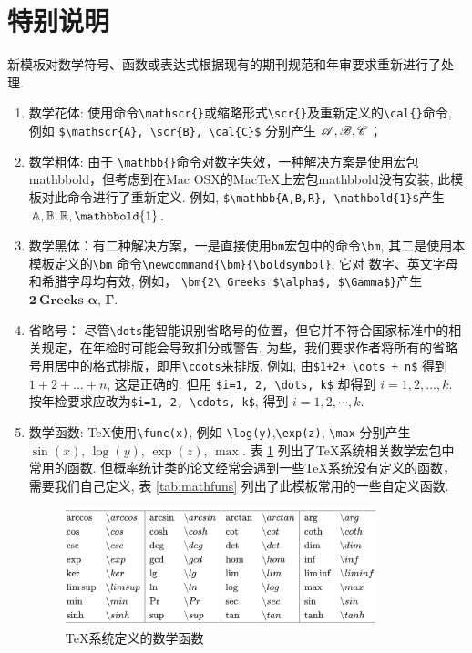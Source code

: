 \documentclass[Chinese]{APSart}
\begin{document}
\section{特别说明}\label{remarks}

新模板对数学符号、函数或表达式根据现有的期刊规范和年审要求重新进行了处理.
\begin{enumerate}[leftmargin=7.8mm,itemsep=-0.1ex, label=(\arabic*)]
\item 数学花体: 使用命令\verb/\mathscr{}/或缩略形式\verb|\scr{}|及重新定义的\verb|\cal{}|命令, 例如 \verb/$\mathscr{A}, \scr{B}, \cal{C}$/ 分别产生 $\mathscr{A}, \mathscr{B}, \mathscr{C}$；
\item 数学粗体: 由于
\verb|\mathbb{}|命令对数字失效，一种解决方案是使用宏包mathbbold，但考虑到在Mac OSX的Mac\TeX{}上宏包mathbbold没有安装, 此模板对此命令进行了重新定义. 例如, 
\verb/$\mathbb{A,B,R}, \mathbold{1}$/产生$\mathbb{A,B,R}, \mathbbold{1}$.
\item 数学黑体：有二种解决方案，一是直接使用\texttt{bm}宏包中的命令\verb|\bm|, 其二是使用本模板定义的\verb|\bm| 命令\verb/\newcommand{\bm}{\boldsymbol}/, 它对 
数字、英文字母和希腊字母均有效, 例如，
\verb|\bm{2\ Greeks $\alpha$, $\Gamma$}|产生 $\bm{2\ Greeks}$ $\bm{\alpha}$, $\bm{\Gamma}$.
\item 省略号： 尽管\verb|\dots|能智能识别省略号的位置，但它并不符合国家标准中的相关规定，在年检时可能会导致扣分或警告. 为些，我们要求作者将所有的省略号用居中的格式排版，即用\verb/\cdots/来排版. 例如,  
由\verb=$1+2+ \dots + n$= 得到 $1+2+ \dots + n$, 这是正确的. 但用
\verb/$i=1, 2, \dots, k$/ 却得到 $i=1, 2, \dots, k$. 按年检要求应改为\verb/$i=1, 2, \cdots, k$/,  得到 $i=1, 2, \cdots, k$.
\item 数学函数: \TeX{}使用\verb|\func(x)|, 例如 \verb|\log(y)|,\verb|\exp(z)|, \verb|\max| 分别产生
$\sin(x)$, $\log(y)$, $\exp(z)$, $\max$. 表 \ref{fig:mathfuns} 列出了\TeX{}系统相关数学宏包中常用的函数. 但概率统计类的论文经常会遇到一些\TeX{}系统没有定义的函数，需要我们自己定义, 表 \ref{tab:mathfuns} 列出了此模板常用的一些自定义函数. 

\begin{figure}[htbp]
	\centering
	\includegraphics[width=0.85\textwidth]{figs/texmathop.png}
	\caption{\TeX{}系统定义的数学函数\label{fig:mathfuns}}
\end{figure}


\end{enumerate}
\end{document}
